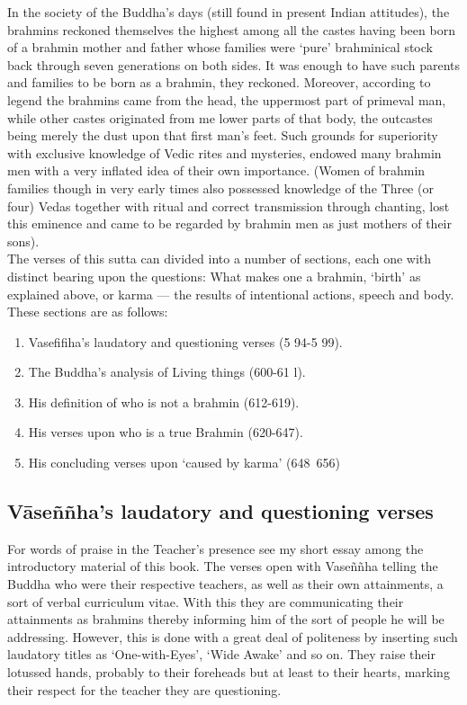In the society of the Buddha's days (still found in present Indian attitudes), the brahmins reckoned themselves the highest among all the castes having been born of a brahmin mother and father whose families were `pure' brahminical stock back through seven generations on both sides. It was enough to have such parents and families to be born as a brahmin, they reckoned. Moreover, according to legend the brahmins came from the head, the uppermost part of primeval man, while other castes originated from me lower parts of that body, the outcastes being merely the dust upon that first man's feet. Such grounds for superiority with exclusive knowledge of Vedic rites and mysteries, endowed many brahmin men with a very inflated idea of their own importance. (Women of brahmin families though in very early times also possessed knowledge of the Three (or four) Vedas together with ritual and correct transmission through chanting, lost this eminence and came to be regarded by brahmin men as just mothers of their sons).\\


The verses of this sutta can divided into a number of sections, each one with distinct bearing upon the questions: What makes one a brahmin, `birth' as explained above, or karma — the results of intentional actions, speech and body. These sections are as follows:

\begin{enumerate}
\item Vaseﬁﬁha's laudatory and questioning verses (5 94-5 99).
\item The Buddha's analysis of Living things (600-61 l).
\item His deﬁnition of who is not a brahmin (612-619).
\item His verses upon who is a true Brahmin (620-647).
\item His concluding verses upon `caused by karma' (648~656)
\end{enumerate}

\subsection{V\=ase\~n\~nha's laudatory and questioning verses}
For words of praise in the Teacher's presence see my short essay among the introductory material of this book. The verses open with Vase\~n\~nha telling the Buddha who were their respective teachers, as well as their own attainments, a sort of verbal curriculum vitae. With this they are communicating their attainments as brahmins thereby informing him of the sort of people he will be addressing. However, this is done with a great deal of politeness by inserting such laudatory titles as `One-with-Eyes', `Wide Awake' and so on. They raise their lotussed hands, probably to their foreheads but at least to their hearts, marking their respect for the teacher they are questioning.


